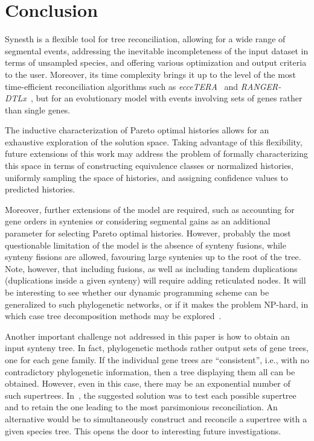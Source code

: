 \section{Conclusion}

Synesth is a flexible tool for tree reconciliation, allowing for a wide range of segmental events, addressing the inevitable incompleteness of the input dataset in terms of unsampled species, and offering various optimization and output criteria to the user.
Moreover, its time complexity brings it up to the level of the most time-efficient reconciliation algorithms such as \emph{ecceTERA}~\parencite{Jacox2016EcceteraComprehensiveGene} and \emph{RANGER-DTLx}~\parencite{Weiner2021ImprovedDuplicationTransfer}, but for an evolutionary model with events involving sets of genes rather than single genes.

The inductive characterization of Pareto optimal histories allows for an exhaustive exploration of the solution space.
Taking advantage of this flexibility, future extensions of this work may address the problem of formally characterizing this space in terms of constructing equivalence classes or normalized histories, uniformly sampling the space of histories, and assigning confidence values to predicted histories.

Moreover, further extensions of the model are required, such as accounting for gene orders in syntenies or considering segmental gains as an additional parameter for selecting Pareto optimal histories.
However, probably the most questionable limitation of the model is the absence of synteny fusions, while synteny fissions are allowed, favouring large syntenies up to the root of the tree.
Note, however, that including fusions, as well as including tandem duplications (duplications inside a given synteny) will require adding reticulated nodes.
It will be interesting to see whether our dynamic programming scheme can be generalized to such phylogenetic networks, or if it makes the problem NP-hard, in which case tree decomposition methods may be explored~\parencite{Scornavacca2022TreewidthBasedAlgorithms}.

Another important challenge not addressed in this paper is how to obtain an input synteny tree.
In fact, phylogenetic methods rather output sets of gene trees, one for each gene family.
If the individual gene trees are \enquote{consistent}, i.e., with no contradictory phylogenetic information, then a tree displaying them all can be obtained.
However, even in this case, there may be an exponential number of such supertrees.
In~\textcite{Delabre2020EvolutionSegmentalDuplications}, the suggested solution was to test each possible supertree and to retain the one leading to the most parsimonious reconciliation.
An alternative would be to simultaneously construct and reconcile a supertree with a given species tree. This opens the door to interesting future investigations.
